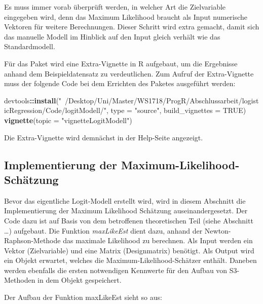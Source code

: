 \documentclass[12pt,]{article}
\newenvironment{Shaded}{\begin{snugshade}}{\end{snugshade}}
\newcommand{\KeywordTok}[1]{\textcolor[rgb]{0.13,0.29,0.53}{\textbf{#1}}}
\newcommand{\DataTypeTok}[1]{\textcolor[rgb]{0.13,0.29,0.53}{#1}}
\newcommand{\StringTok}[1]{\textcolor[rgb]{0.31,0.60,0.02}{#1}}
\newcommand{\CommentTok}[1]{\textcolor[rgb]{0.56,0.35,0.01}{\textit{#1}}}
\newcommand{\OtherTok}[1]{\textcolor[rgb]{0.56,0.35,0.01}{#1}}
\newcommand{\ControlFlowTok}[1]{\textcolor[rgb]{0.13,0.29,0.53}{\textbf{#1}}}
\newcommand{\OperatorTok}[1]{\textcolor[rgb]{0.81,0.36,0.00}{\textbf{#1}}}
\newcommand{\NormalTok}[1]{#1}
\begin{document}
Es muss immer vorab überprüft werden, in welcher Art die Zielvariable
eingegeben wird, denn das Maximum Likelihood braucht als Input
numerische Vektoren für weitere Berechnungen. Dieser Schritt wird extra
gemacht, damit sich das manuelle Modell im Hinblick auf den Input gleich
verhält wie das Standardmodell.

Für das Paket wird eine Extra-Vignette in R aufgebaut, um die Ergebnisse
anhand dem Beispieldatensatz zu verdeutlichen. Zum Aufruf der
Extra-Vignette muss der folgende Code bei dem Errichten des Paketes
ausgeführt werden:

\begin{Shaded}
\begin{Highlighting}[]
\NormalTok{devtools}\OperatorTok{::}\KeywordTok{install}\NormalTok{(}\StringTok{"~/Desktop/Uni/Master/WS1718/ProgR/Abschlussarbeit/logisticRegression/Code/logitModell/"}\NormalTok{, }\DataTypeTok{type =} \StringTok{"source"}\NormalTok{, }\DataTypeTok{build_vignettes =} \OtherTok{TRUE}\NormalTok{)}
\KeywordTok{vignette}\NormalTok{(}\DataTypeTok{topic =} \StringTok{"vignetteLogitModell"}\NormalTok{)}
\end{Highlighting}
\end{Shaded}

Die Extra-Vignette wird demnächst in der Help-Seite angezeigt.

\subsection{Implementierung der
Maximum-Likelihood-Schätzung}\label{implementierung-der-maximum-likelihood-schatzung}

Bevor das eigentliche Logit-Modell erstellt wird, wird in diesem
Abschnitt die Implementierung der Maximum Likelihood Schätzung
auseinandergesetzt. Der Code dazu ist auf Basis von dem betroffenen
theoretischen Teil (siehe Abschnitt \ldots{}) aufgebaut. Die Funktion
\emph{maxLikeEst} dient dazu, anhand der Newton-Raphson-Methode das
maximale Likelihood zu berechnen. Als Input werden ein Vektor
(Zielvariable) und eine Matrix (Designmatrix) benötigt. Als Output wird
ein Objekt erwartet, welches die Maximum-Likelihood-Schätzer enthält.
Daneben werden ebenfalls die ersten notwendigen Kennwerte für den Aufbau
von S3-Methoden in dem Objekt gespeichert.

Der Aufbau der Funktion maxLikeEst sieht so aus:

\begin{Shaded}
\end{Shaded}
\end{document}
